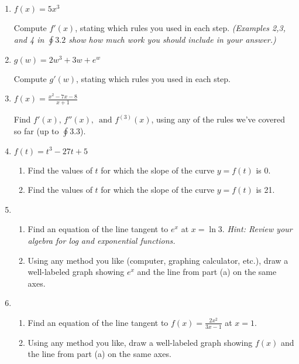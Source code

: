 \documentclass[12pt,letterpaper]{article}
\begin{document}
\begin{enumerate}
\item  $f(x)=5x^3$

Compute $f'(x)$, stating which rules you used in each step.  \emph{(Examples 2,3, and 4 in $\oint 3.2$ show how much work you should include in your answer.)}

\vspace{1pc}
\item $g(w)=2w^3+3w+e^w$

Compute $g'(w)$, stating which rules you used in each step.

\vspace{1pc}
\item $\displaystyle f(x)=\frac{x^2-7x-8}{x+1}$

Find $f'(x),\,f''(x),\,\text{ and }f^{(3)}(x)$, using any of the rules we've covered so far (up to $\oint 3.3$).

\vspace{1pc}
\item $f(t)=t^3-27t+5$
	\begin{enumerate}
	\item Find the values of $t$ for which the slope of the curve $y=f(t)$ is 0.  
	\item Find the values of $t$ for which the slope of the curve $y=f(t)$ is 21.
	\end{enumerate}

\vspace{1pc}	
\item \begin{enumerate}
		\item Find an equation of the line tangent to $e^x$ at $x=\ln 3$.  \emph{Hint: Review your algebra for log and exponential functions.}
		\item Using any method you like (computer, graphing calculator, etc.), draw a well-labeled graph showing $e^x$ and the line from part (a) on the same axes.
		\end{enumerate}

\vspace{1pc}
\item \begin{enumerate} 
	\item Find an equation of the line tangent to $f(x)=\displaystyle\frac{2x^2}{3x-1}$ at $x=1$. 
	\item Using any method you like, draw a well-labeled graph showing $f(x)$ and the line from part (a) on the same axes.
	\end{enumerate}


\end{enumerate}
\end{document}
